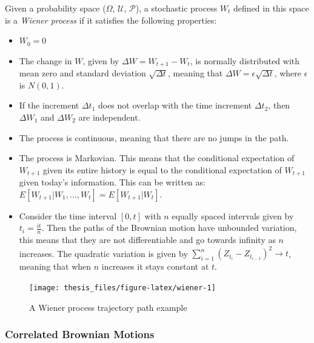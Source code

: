 \documentclass[12pt,twoside]{reedthesis}
\theoremstyle{definition}
\theoremstyle{definition}
\theoremstyle{remark}
\begin{document}
  \protect\hypertarget{def:unnamed-chunk-2}{}{\label{def:unnamed-chunk-2}
  {} }Given a probability space (\(\Omega\),
  \(\mathcal {U}\), \(\mathcal {P}\)), a stochastic process \(W_t\)
  defined in this space is a \emph{Wiener process} if it satisfies the
  following properties:
  \begin{itemize}
    \item  $W_{0}=0$
    
    \item The change in $W$, given by $\Delta W = W_{t+1}-W_{t}$, is normally distributed with mean zero and standard deviation $\sqrt{\Delta t}$, meaning that $\Delta W = \epsilon\sqrt{\Delta t}$, where $\epsilon$ is $N(0,1)$.
    
    \item If the increment $\Delta t_1$ does not overlap with the time increment $\Delta t_2$, then $\Delta W_1$ and $\Delta W_2$ are independent.
    
    \item The process is continuous, meaning that there are no jumps in the path.
    
    \item The process is Markovian. This means that the conditional expectation of $W_{t+1}$ given its entire history is equal to the conditional expectation of $W_{t+1}$ given today's information. This can be written as: $E[W_{t+1}|W_1, ..., W_t] = E[W_{t+1}|W_t]$.
    
    \item Consider the time interval $[0,t]$ with $n$ equally spaced intervals given by $t_i = \frac{it}{n}$. Then the paths of the Brownian motion have unbounded variation, this means that they are not differentiable and go towards infinity as $n$ increases. The quadratic variation is given by $\sum_{i=1}^{n}{(Z_{t_i}-Z_{t_{i-1}})^2} \rightarrow t$, meaning that when $n$ increases it stays constant at $t$. 
  
  \end{itemize}
  \begin{figure}
  
  {\centering \texttt{[image: thesis\_files/figure-latex/wiener-1]} 
  
  }
  
  \caption{A Wiener process trajectory path example \label{wiener}}\label{fig:wiener}
  \end{figure}
  \subsubsection{Correlated Brownian Motions}\label{corr}
  
\end{document}
